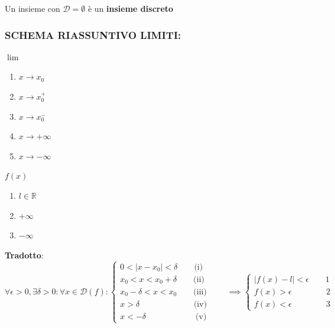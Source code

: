 Un insieme con $\mathcal{D} = \emptyset $ è un \textbf{insieme discreto}

\subsubsection{SCHEMA RIASSUNTIVO LIMITI:} %
$\lim$
\begin{enumerate}[label=(\roman*)]
    \item $x\to x_0$
    \item $x\to x_0^+$
    \item $x\to x_0^-$
    \item $x\to +\infty$
    \item $x\to -\infty$
\end{enumerate}
$f(x)$
\begin{enumerate}
    \item $l \in \mathbb{R}$
    \item $+ \infty$
    \item $- \infty$
\end{enumerate}

\textbf{Tradotto}:
\begin{equation*}
    \forall \epsilon >0, \exists \delta > 0: \forall x \in \mathcal{D}(f) :
    \begin{cases*}
        0 < |x-x_0| < \delta \qquad \text{(i)}\\
        x_0 < x < x_0 + \delta \qquad \text{(ii)}\\
        x_0 - \delta < x < x_0 \qquad \text{(iii)}\\
        x > \delta \qquad \qquad\qquad\;\; \text{(iv)}\\
        x < - \delta \qquad \qquad\qquad \text{(v)}
    \end{cases*}
    \qquad
    \implies 
    \begin{cases*}
        |f(x) - l| < \epsilon \qquad 1\\
        f(x) > \epsilon \qquad\qquad\, 2\\
        f(x) < \epsilon \qquad\qquad\, 3
    \end{cases*}
\end{equation*}

